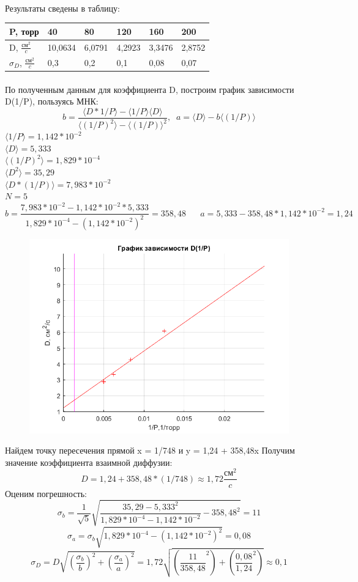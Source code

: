 \documentclass[a4paper,12pt]{article}
\begin{document}
\paragraph{} 
Результаты сведены в таблицу:


\begin{tabular}{|l|l|l|l|l|l|}
\hline 
P, торр & 40 & 80 & 120 & 160 & 200 \\ 
\hline 
D, $\frac{\text{см}^2}{c}$ & 10,0634 & 6,0791 & 4,2923 & 3,3476 & 2,8752 \\ 
\hline 
$\sigma_{D}$,  $\frac{\text{см}^2}{c}$ & 0,3 & 0,2 & 0,1 & 0,08 & 0,07 \\ 
\hline 
\end{tabular} 
\paragraph{} 
 По полученным данным для коэффициента D, построим график зависимости D(1/P), пользуясь МНК:
 \begin{equation*}
b = \frac{\langle D*1/P \rangle - \langle 1/P \rangle \langle D \rangle}{\langle (1/P)^2 \rangle - \langle (1/P) \rangle ^ 2}, \;\;
a = \langle D \rangle - b \langle (1/P) \rangle  \label{lsf}
\end{equation*}
$\langle 1/P \rangle = 1,142*10^{-2}$\\ 
$\langle D \rangle = 5,333$\\
$\langle (1/P)^2 \rangle = 1,829 * 10^{-4}$\\
$\langle D^2 \rangle = 35,29$\\
$\langle D*(1/P) \rangle = 7,983 * 10^{-2}$\\
$N=5$
\begin{equation*}
b = \frac{7,983 * 10^{-2} - 1,142*10^{-2}*5,333}{1,829 * 10^{-4} - (1,142*10^{-2})^2} = 358,48 \;\;\;\;\;\; a = 5,333 - 358,48*1,142*10^{-2} = 1,24
\end{equation*}
\begin{figure}[h]
\begin{center}
\includegraphics[width=0.5\linewidth]{graph_3.png}
\end{center}
\end{figure}
Найдем точку пересечения прямой x = 1/748 и y = 1,24 + 358,48x
Получим значение коэффициента взаимной диффузии:
$$D = 1,24 + 358,48 * (1/748) \approx 1,72 \frac{\text{см}^2}{c}$$
Оценим погрешность:
$$\sigma_{b} = \frac{1}{\sqrt{5}}\sqrt{\frac{35,29 - 5,333^2}{1,829*10^{-4} - 1,142*10^{-2}} - 358,48^2} = 11 $$
$$\sigma_{a} = \sigma_{b}\sqrt{1,829*10^{-4} - (1,142*10^{-2})^2} = 0,08$$
$$\sigma_{D} = D\sqrt{(\frac{\sigma_{b}}{b})^2 + (\frac{\sigma_{a}}{a})^2} = 1,72\sqrt{({\frac{11}{358,48}}^2) + ({\frac{0,08}{1,24}}^2)} \approx 0,1 $$
\end{document}
